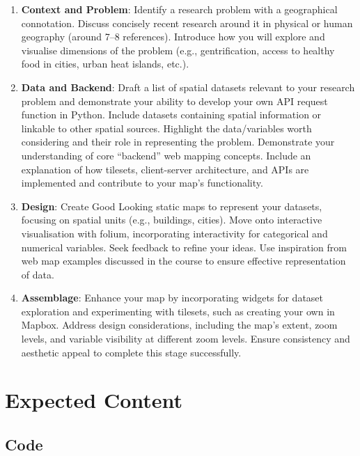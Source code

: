 \documentclass[
  letterpaper,
  DIV=11,
  numbers=noendperiod]{scrreprt}
\providecommand{\tightlist}{%
  \setlength{\itemsep}{0pt}\setlength{\parskip}{0pt}}\usepackage{longtable,booktabs,array}
\begin{document}
\begin{enumerate}
\def\labelenumi{\arabic{enumi}.}
\tightlist
\item
  \textbf{Context and Problem}: Identify a research problem with a
  geographical connotation. Discuss concisely recent research around it
  in physical or human geography (around 7--8 references). Introduce how
  you will explore and visualise dimensions of the problem (e.g.,
  gentrification, access to healthy food in cities, urban heat islands,
  etc.).
\item
  \textbf{Data and Backend}: Draft a list of spatial datasets relevant
  to your research problem and demonstrate your ability to develop your
  own API request function in Python. Include datasets containing
  spatial information or linkable to other spatial sources. Highlight
  the data/variables worth considering and their role in representing
  the problem. Demonstrate your understanding of core ``backend'' web
  mapping concepts. Include an explanation of how tilesets,
  client-server architecture, and APIs are implemented and contribute to
  your map's functionality.
\item
  \textbf{Design}: Create Good Looking static maps to represent your
  datasets, focusing on spatial units (e.g., buildings, cities). Move
  onto interactive visualisation with folium, incorporating
  interactivity for categorical and numerical variables. Seek feedback
  to refine your ideas. Use inspiration from web map examples discussed
  in the course to ensure effective representation of data.
\item
  \textbf{Assemblage}: Enhance your map by incorporating widgets for
  dataset exploration and experimenting with tilesets, such as creating
  your own in Mapbox. Address design considerations, including the map's
  extent, zoom levels, and variable visibility at different zoom levels.
  Ensure consistency and aesthetic appeal to complete this stage
  successfully.
\end{enumerate}

\section*{Expected Content}\label{expected-content}


\subsection*{Code}\label{code}
\end{document}
